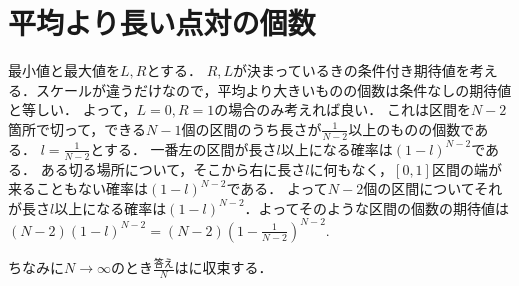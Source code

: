 \section{平均より長い点対の個数}
最小値と最大値を$L,R$とする．
$R,L$が決まっているきの条件付き期待値を考える．スケールが違うだけなので，平均より大きいものの個数は条件なしの期待値と等しい．
よって，$L=0,R=1$の場合のみ考えれば良い．
これは区間を$N-2$箇所で切って，できる$N-1$個の区間のうち長さが$\frac{1}{N-2}$以上のものの個数である．
$l = \frac{1}{N-2}$とする．
一番左の区間が長さ$l$以上になる確率は$(1-l)^{N-2}$である．
ある切る場所について，そこから右に長さ$l$に何もなく，$[0,1]$区間の端が来ることもない確率は$(1-l)^{N-2}$である．
よって$N-2$個の区間についてそれが長さ$l$以上になる確率は$(1-l)^{N-2}$．よってそのような区間の個数の期待値は
$(N-2)(1-l)^{N-2} = (N-2)(1-\frac{1}{N-2})^{N-2}$.

ちなみに$N \to \infty$のとき$\frac{\mathrm{答え}}{N}$はに収束する．
